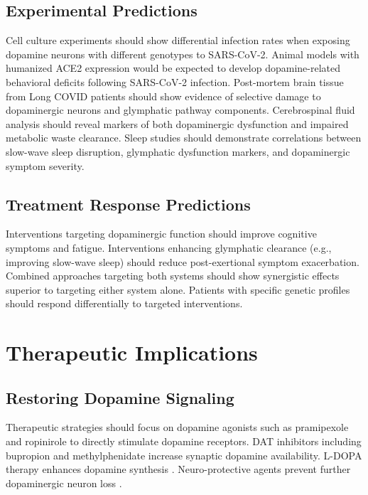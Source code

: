 \documentclass[12pt]{article}
\begin{document}
\subsection{Experimental Predictions}

Cell culture experiments should show differential infection rates when exposing dopamine neurons with different genotypes to SARS-CoV-2. Animal models with humanized ACE2 expression would be expected to develop dopamine-related behavioral deficits following SARS-CoV-2 infection. Post-mortem brain tissue from Long COVID patients should show evidence of selective damage to dopaminergic neurons and glymphatic pathway components. Cerebrospinal fluid analysis should reveal markers of both dopaminergic dysfunction and impaired metabolic waste clearance. Sleep studies should demonstrate correlations between slow-wave sleep disruption, glymphatic dysfunction markers, and dopaminergic symptom severity.

\subsection{Treatment Response Predictions}

Interventions targeting dopaminergic function should improve cognitive symptoms and fatigue. Interventions enhancing glymphatic clearance (e.g., improving slow-wave sleep) should reduce post-exertional symptom exacerbation. Combined approaches targeting both systems should show synergistic effects superior to targeting either system alone. Patients with specific genetic profiles should respond differentially to targeted interventions.

\section{Therapeutic Implications}

\subsection{Restoring Dopamine Signaling}

Therapeutic strategies should focus on dopamine agonists such as pramipexole and ropinirole to directly stimulate dopamine receptors. DAT inhibitors including bupropion and methylphenidate increase synaptic dopamine availability. L-DOPA therapy enhances dopamine synthesis \citep{beauchamp2022parkinsonismwave, delprete2021parkinsoncovidimpact}. Neuro-protective agents prevent further dopaminergic neuron loss \citep{limanaqi2022dopamineregulation, nataf2020ddcace2}.
\end{document}
